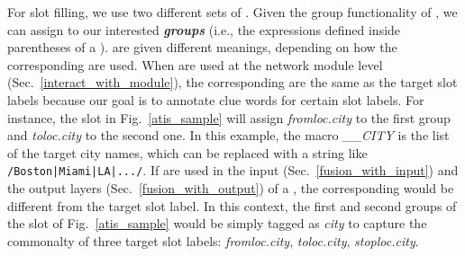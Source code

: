 For slot filling, we use two different sets of \REs. Given the group functionality of \RE, we can assign \REtags to our interested
\textbf{\emph{\RE groups}} (i.e., the expressions defined inside parentheses of a \RE). \REtags are given different meanings, depending on
how the corresponding \REs are used. When \REs are used at the network module level (Sec.~\ref{interact_with_module}), the corresponding
\REtags are the same as the target slot labels because our goal is to annotate clue words for certain slot labels. For instance, the slot
\RE in Fig.~\ref{atis_sample} will assign \emph{fromloc.city} to the first \RE group and \emph{toloc.city} to the second one. In this
example, the macro \emph{\_\_CITY} is the list of the target city names, which can be replaced with a string like
\texttt{/Boston|Miami|LA|.../}. If \REs are used in the input (Sec.~\ref{fusion_with_input}) and the output layers
(Sec.~\ref{fusion_with_output}) of a \NN, the corresponding \REtag would be different from the target slot label. In this context, the
first and second \RE groups of the slot \RE of Fig.~\ref{atis_sample} would be simply tagged as \emph{city} to capture the commonalty of
three target slot labels: \emph{fromloc.city}, \emph{toloc.city}, \emph{stoploc.city}. 
%

